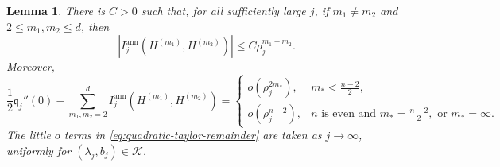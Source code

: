 \documentclass[11pt]{article}
\numberwithin{equation}{section}
\newtheorem{lemma}[theorem]{Lemma}
\theoremstyle{remark}
\begin{document}
\begin{lemma}\label{lem:mixed-and-taylor-remainder}
There is \(C>0\) such that, for all sufficiently large \(j\), if
\(m_1\ne m_2\) and
\(2\le m_1,m_2\le d\), then
\begin{equation}\label{eq:mixed-degree-bound}
 |I_j^{\mathrm{ann}}(H^{(m_1)},H^{(m_2)})|
 \le C\rho_j^{m_1+m_2}.
\end{equation}
Moreover,
\begin{equation}\label{eq:quadratic-taylor-remainder}
 \frac12\mathfrak q_j''(0)
 -\sum_{m_1,m_2=2}^{d}
 I_j^{\mathrm{ann}}(H^{(m_1)},H^{(m_2)})
 =\begin{cases}
   o(\rho_j^{2m_*}),&m_*<\frac{n-2}{2},\\
   o(\rho_j^{n-2}),&
   n\text{ is even and }m_*=\frac{n-2}{2},
   \text{ or }m_*=\infty.
  \end{cases}
\end{equation}
The little \(o\) terms in \eqref{eq:quadratic-taylor-remainder} are
taken as \(j\to\infty\), uniformly for
\((\lambda_j,b_j)\in\mathcal K\).
\end{lemma}
\end{document}
